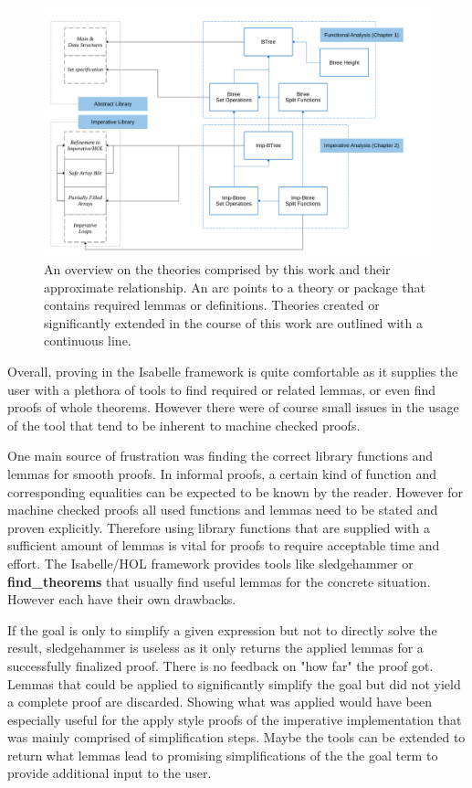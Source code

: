 \begin{figure}
    \centering
    \includegraphics[width=1.1\linewidth]{figures/theories-relationship.pdf}
    \caption[An overview on the theories comprised by this work
    and their approximate relationship.]{
    An overview on the theories comprised by this work
    and their approximate relationship.
    An arc points to a theory or package
    that contains required lemmas or definitions.
    Theories created or significantly extended in the course of this work are outlined with a continuous line.}
    \label{fig:thm-relationships}
\end{figure}

Overall, proving in the Isabelle framework is quite comfortable
as it supplies the user with a plethora of tools
to find required or related lemmas,
or even find proofs of whole theorems.
However there were of course small issues
in the usage of the tool that tend to be 
inherent to machine checked proofs.

One main source of frustration was finding the correct
library functions and lemmas for smooth proofs.
In informal proofs, a certain kind of function and corresponding equalities can be
expected to be known by the reader.
However for machine checked proofs
all used functions and lemmas need to be stated
and proven explicitly.
Therefore using library functions that are supplied
with a sufficient amount of lemmas is vital for proofs
to require acceptable time and effort.
The Isabelle/HOL framework provides tools like sledgehammer
or \textbf{find\_theorems} that usually find useful lemmas for the concrete situation.
However each have their own drawbacks.

If the goal is only to simplify a given expression but not to
directly solve the result, sledgehammer is useless
as it only returns the applied lemmas for a successfully finalized proof.
There is no feedback on "how far" the proof got.
Lemmas that could be applied to significantly simplify the goal
but did not yield a complete proof are discarded.
Showing what was applied
would have been especially useful for the apply style proofs of the
imperative implementation that was mainly comprised of simplification steps.
Maybe the tools can be extended to return what lemmas lead to promising
simplifications of the the goal term to provide additional input to the user.

